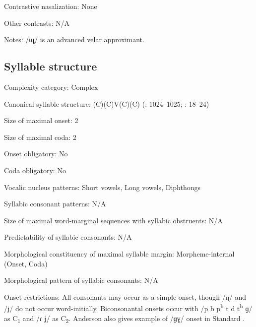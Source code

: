 {\begin{appendixdesc}
\item[Contrastive nasalization:] None

\item[Other contrasts:] N/A

\item[Notes:] /ɰ̟/ is an advanced velar approximant.
\end{appendixdesc}
\subsection*{Syllable structure}
\begin{appendixdesc}

\item[Complexity category:] Complex

\item[Canonical syllable structure:] (C)(C)V(C)(C) (\citealt{Anderson1997}: 1024--1025; \citealt{Yoshioka2012}: 18--24)

\item[Size of maximal onset:] 2

\item[Size of maximal coda:] 2

\item[Onset obligatory:] No

\item[Coda obligatory:] No

\item[Vocalic nucleus patterns:] Short vowels, Long vowels, Diphthongs

\item[Syllabic consonant patterns:] N/A

\item[Size of maximal word-marginal sequences with syllabic obstruents:] N/A

\item[Predictability of syllabic consonants:] N/A

\item[Morphological constituency of maximal syllable margin:] Morpheme-internal (Onset, Coda)

\item[Morphological pattern of syllabic consonants:] N/A

\item[Onset restrictions:] All consonants may occur as a simple onset, though /ŋ/ and /j/ do not occur word-initially. Biconsonantal onsets occur with /p b p\textsuperscript{h} t d t\textsuperscript{h} ɡ/ as C\textsubscript{1} and /ɾ j/ as C\textsubscript{2}. Anderson also gives example of /ɡɣ/ onset in Standard .


\end{appendixdesc}}
